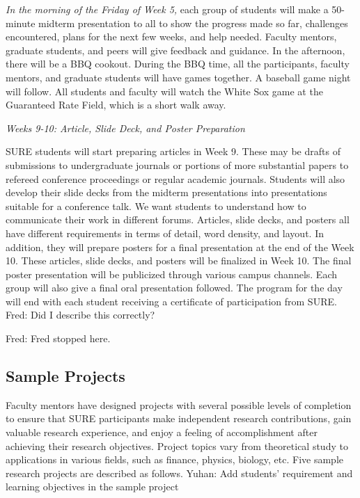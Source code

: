 \documentclass[11pt]{NSFamsart}
\newcommand{\FJHNote}[1]{{\color{blue}Fred: #1}}
\newcommand{\YDNote}[1]{{\color{magenta}Yuhan: #1}}
\begin{document}
\emph{In the morning of the Friday of Week 5,}
each group of students will make a 50-minute midterm presentation to all to show the progress made so far, challenges encountered, plans for the next few weeks, and help needed. Faculty mentors,
graduate students, and peers will give feedback and guidance. In the afternoon, there will be a BBQ cookout. During the BBQ time, all the participants, faculty mentors, and graduate students will have games together. A baseball game night  
will follow. All students and faculty will watch the White Sox game at the Guaranteed Rate Field, which is a short walk away.


\centerline{\emph{Weeks 9-10: Article, Slide Deck, and Poster Preparation}} 

SURE students will start preparing articles in Week 9. These may be drafts of submissions to undergraduate journals or portions of more substantial papers to refereed conference proceedings or regular academic journals. Students will also develop their slide decks from the midterm presentations into presentations suitable for a conference talk. We want students to understand how to communicate their work in different forums.  Articles, slide decks, and posters all have different requirements in terms of detail, word density, and layout. In addition, they will prepare posters for a final presentation at the end of the Week 10.  These articles, slide decks, and posters will be finalized in Week 10. The final poster presentation will be publicized through various campus channels. Each group will also give a final oral presentation followed.  The program for the day will end with each student receiving a certificate of participation from SURE. \FJHNote{Did I describe this correctly?}


\FJHNote{Fred stopped here.}

\subsection{Sample Projects }
Faculty mentors have designed projects with several possible levels of completion to ensure that SURE participants
make independent research contributions, gain valuable research experience, and enjoy a feeling of
accomplishment after achieving their research objectives. Project topics vary from theoretical study to applications in various fields, such as finance, physics, biology, etc. Five sample research projects are described as follows.
\YDNote{Add students' requirement and learning objectives in the sample project}
%
\end{document}
